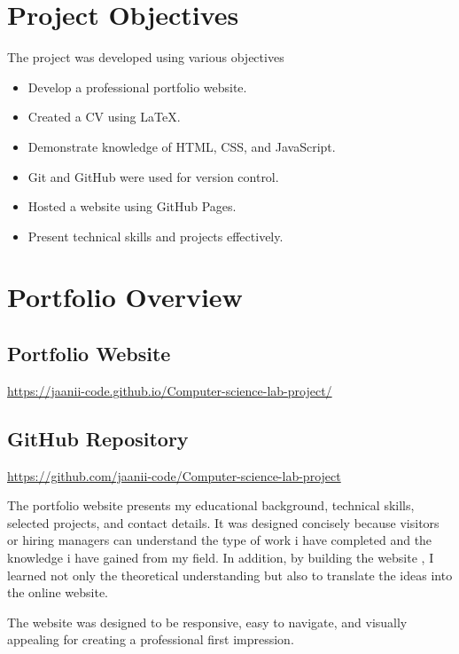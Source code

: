 \documentclass[12pt,a4paper]{article}
\begin{document}
\section{Project Objectives}

The project was developed using various objectives 

\begin{itemize}
    \item Develop a professional portfolio website.
    \item Created a CV using LaTeX.
    \item Demonstrate knowledge of HTML, CSS, and JavaScript.
    \item Git and GitHub were used for version control.
    \item  Hosted a website using GitHub Pages.
    \item Present technical skills and projects effectively.
\end{itemize}

\section{Portfolio Overview}

\subsection{Portfolio Website}

\url{https://jaanii-code.github.io/Computer-science-lab-project/}

\subsection{GitHub Repository}

\url{https://github.com/jaanii-code/Computer-science-lab-project}


The portfolio website presents my educational background, technical skills, selected projects, and contact details. It was designed concisely because visitors or hiring managers can understand the type of work i have completed and the knowledge i  have gained from my field. In addition, by building the website , I learned not only the theoretical understanding but also to translate the ideas into the online website.

The website was designed to be responsive, easy to navigate, and visually appealing for creating a professional first impression.
\end{document}
